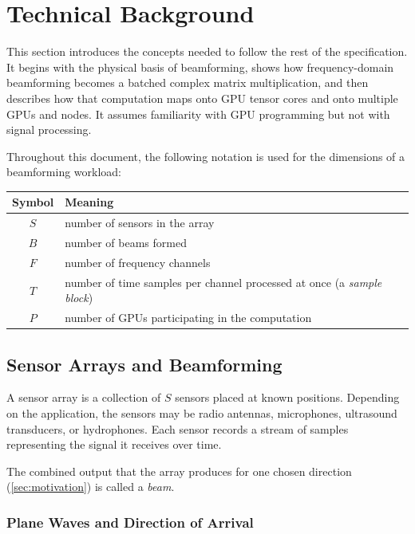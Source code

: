 \section{Technical Background}
\label{sec:technical-background}

This section introduces the concepts needed to follow the rest of the specification. It begins with the physical basis of beamforming, shows how frequency-domain beamforming becomes a batched complex matrix multiplication, and then describes how that computation maps onto GPU tensor cores and onto multiple GPUs and nodes. It assumes familiarity with GPU programming but not with signal processing.

Throughout this document, the following notation is used for the dimensions of a beamforming workload:

\begin{center}
\begin{tabular}{@{}cl@{}}
  \toprule
  Symbol & Meaning \\
  \midrule
  $S$ & number of sensors in the array \\
  $B$ & number of beams formed \\
  $F$ & number of frequency channels \\
  $T$ & number of time samples per channel processed at once (a \emph{sample block}) \\
  $P$ & number of GPUs participating in the computation \\
  \bottomrule
\end{tabular}
\end{center}

\subsection{Sensor Arrays and Beamforming}
\label{sec:sensor-arrays-and-beamforming}

A sensor array is a collection of $S$ sensors placed at known positions. Depending on the application, the sensors may be radio antennas, microphones, ultrasound transducers, or hydrophones. Each sensor records a stream of samples representing the signal it receives over time.

The combined output that the array produces for one chosen direction (\cref{sec:motivation}) is called a \emph{beam}.

\subsubsection{Plane Waves and Direction of Arrival}
\label{sec:plane-waves-and-direction-of-arrival}

